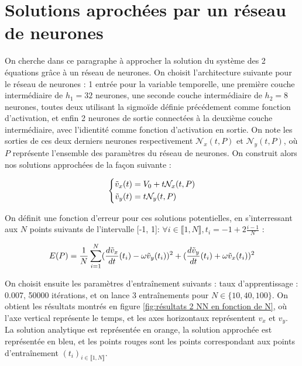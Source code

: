 \documentclass[12pt]{report}
\begin{document}
\section{Solutions aprochées par un réseau de neurones}

On cherche dans ce paragraphe à approcher la solution du système des 2 équations
grâce à un réseau de neurones.
On choisit l'architecture suivante pour le réseau de neurones : 
1 entrée pour la variable temporelle, une première couche intermédiaire de 
$h_1=32$ neurones, une seconde couche intermédiaire de $h_2=8$ neurones, toutes 
deux utilisant la sigmoïde définie précédement comme fonction d'activation, 
et enfin 2 neurones de sortie connectées à la deuxième couche intermédiaire, avec 
l'idientité comme fonction d'activation en sortie.
On note les sorties de ces deux derniers neurones respectivement $\mathcal{N}_x(t, P)$
et $\mathcal{N}_y(t, P)$, où $P$ représente l'ensemble des paramètres du réseau de neurones.
On construit alors nos solutions approchées de la façon suivante :

\begin{equation}
    \left\{
        \begin{aligned}
            \Tilde{v}_x(t) &= V_0+ t\mathcal{N}_x(t, P) \\
            \Tilde{v}_y(t) &= t\mathcal{N}_y(t, P)
        \end{aligned}
    \right.
    \label{eq:solution 2_NN}
    \end{equation}

On définit une fonction d'erreur pour ces solutions potentielles, 
en s'interressant aux $N$ points suivants de l'intervalle [-1, 1]: 
$\forall i \in\llbracket 1,N \rrbracket, t_i = -1 + 2\frac{i-1}{N} $ :

\begin{equation}
        E(P) = \frac{1}{N}\sum_{i=1}^{N} (\frac{d\Tilde{v}_x}{dt}(t_i) - \omega \Tilde{v}_y(t_i))^2 + (\frac{d\Tilde{v}_y}{dt}(t_i) + \omega \Tilde{v}_x(t_i))^2
\label{eq:erreur 2_NN}
\end{equation}


On choisit ensuite les paramètres d'entraînement suivants : taux d'apprentissage : 0.007,
50000 itérations, et on lance 3 entraînements pour $N \in \{10,40,100\}$. On obtient les résultats montrés 
en figure \ref{fig:résultats 2 NN en fonction de N}, où l'axe vertical représente le temps,
et les axes horizontaux représentent $v_x$ et $v_y$. La solution analytique est représentée 
en orange, la solution approchée est représentée en bleu, et les points rouges sont les
points correspondant aux points d'entraînement $(t_i)_{i \in \llbracket 1, N \rrbracket}$.
\end{document}

